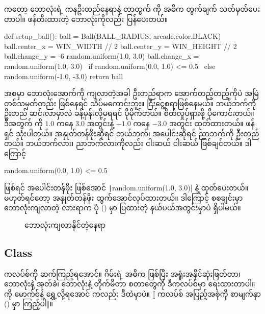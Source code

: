  ကတော့ ဘောလုံးရဲ့ ကနဦးတည်နေရာနဲ့ တာထွက်  ကို အဓိက တွက်ချက် သတ်မှတ်ပေးတာပါ။ ဖန်တီးထားတဲ့ ဘောလုံးကိုလည်း  ပြန်ပေးတယ်။
%
\begin{py}
def setup_ball():
    ball = Ball(BALL_RADIUS, arcade.color.BLACK)
    ball.center_x = WIN_WIDTH // 2
    ball.center_y = WIN_HEIGHT // 2
    ball.change_y = -6
    random.uniform(1.0, 3.0)
    ball.change_x = random.uniform(1.0, 3.0) \
        if random.uniform(0.0, 1.0) <= 0.5 \
        else random.uniform(-1.0, -3.0)
    return ball
\end{py}
%
အစမှာ ဘောလုံးအောက်ကို ကျလာတဲ့အခါ ဦးတည်ရာက အောက်တည့်တည့်ကိုပဲ အမြဲတစ်သမှတ်တည်း ဖြစ်နေရင် သိပ်မကောင်းဘူး။ ငြီးငွေ့စရာဖြစ်နေမယ်။ ဘယ်ဘက်ကို ဦးတည် ဆင်းလာမှာလဲ ခန့်မှန်းလို့မရရင် ပိုမိုက်တယ်။ စိတ်လှုပ်ရှားဖို့ ပိုကောင်းတယ်။ ဒီအတွက်  ကို $1.0$ ကနေ $3.0$ အတွင်းနဲ့  $-1.0$ ကနေ $-3.0$ အတွင်း  ထုတ်ထားတယ်။  ဖန်ရှင် သုံးပါတယ်။  အနှုတ်တန်ဖိုးဆိုရင် ဘယ်ဘက်၊ အပေါင်းဆိုရင် ညာဘက်ကို ဦးတည်တယ်။ ဘယ်ဘက်လား၊ ညာဘက်လားကိုလည်း ငါးဆယ် ငါးဆယ် ဖြစ်ချင်တယ်။ ဒါကြောင့် 
%
\begin{py}
random.uniform(0.0, 1.0) <= 0.5
\end{py}
%
ဖြစ်ရင် အပေါင်းတန်ဖိုး ဖြစ်အောင် \texttt|random.uniform(1.0, 3.0)| နဲ့ ထုတ်ပေးတယ်။ မဟုတ်ရင်တော့ အနှုတ်တန်ဖိုး ထွက်အောင်လုပ်ထားတယ်။ ဒါကြောင့် စစချင်းမှာ ဘောလုံးကျလာတဲ့ လားရာက ပုံ (\fRefNo{\ref{fig:balldir}}) မှာ ပြထားတဲ့ နယ်ပယ်အတွင်းမှာပဲ ရှိပါမယ်။

\begin{figure}[tbh!]
\caption{ဘောလုံးကျလာနိုင်တဲ့နေရာ} 
\label{fig:balldir}
\end{figure}

\subsection*{ Class}
 ကလပ်စ်ကို ဆက်ကြည့်ရအောင်။ ဂိမ်းရဲ့ အဓိက  ဖြစ်ပြီး အရှုံးအနိုင်ဆုံးဖြတ်တာ၊ ဘောလုံးနဲ့ အုတ်ခဲ၊ ဘောလုံးနဲ့  တိုက်မိတာ စတာတွေကို ဒီကလပ်စ်မှာ ရေးထားတာပါ။  ကို မောက်စ်နဲ့  ရွှေ့လို့ရအောင်  ကလည်း ဒီထဲမှာပဲ။ $\big\llbracket$ ကလပ်စ် အပြည့်အစုံကို စာမျက်နှာ (\fRefNo{\pageref{lst:breakout}}) မှာ ကြည့်ပါ$\big\rrbracket$။ 


